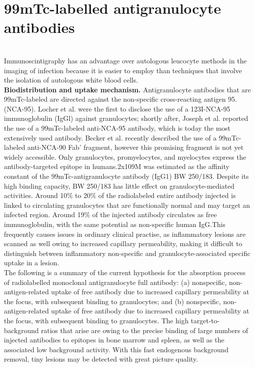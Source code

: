 \documentclass[12pt]{article}
\begin{document}
\section{99mTc-labelled antigranulocyte antibodies}
\\Immunoscintigraphy has an advantage over autologous leucocyte methods in the imaging of infection because it is easier to employ than techniques that involve the isolation of autologous white blood cells.
\\\textbf{Biodistribution and uptake mechanism.} Antigranulocyte antibodies that are 99mTc-labeled are directed against the non-specific cross-reacting antigen 95. (NCA-95). Locher et al. were the first to disclose the use of a 123I-NCA-95 immunoglobulin (IgGl) against granulocytes; shortly after, Joseph et al. reported the use of a 99mTc-labeled anti-NCA-95 antibody, which is today the most extensively used antibody. Becker et al.  recently described the use of a 99mTc-labeled anti-NCA-90 Fab' fragment, however this promising fragment is not yet widely accessible. Only granulocytes, promyelocytes, and myelocytes express the antibody-targeted epitope in humans.2x109M was estimated as the affinity constant of the 99mTc-antigranulocyte antibody (IgG1) BW 250/183. Despite its high binding capacity, BW 250/183 has little effect on granulocyte-mediated activities. Around 10$\%$ to 20$\%$ of the radiolabeled entire antibody injected is linked to circulating granulocytes that are functionally normal and may target an infected region. Around 19$\%$ of the injected antibody circulates as free immunoglobulin, with the same potential as non-specific human IgG.This frequently causes issues in ordinary clinical practise, as inflammatory lesions are scanned as well owing to increased capillary permeability, making it difficult to distinguish between inflammatory non-specific and granulocyte-associated specific uptake in a lesion.
\\The following is a summary of the current hypothesis for the absorption process of radiolabelled monoclonal antigranulocyte full antibody: (a) nonspecific, non-antigen-related uptake of free antibody due to increased capillary permeability at the focus, with subsequent binding to granulocytes; and (b) nonspecific, non-antigen-related uptake of free antibody due to increased capillary permeability at the focus, with subsequent binding to granulocytes. The high target-to-background ratios that arise are owing to the precise binding of large numbers of injected antibodies to epitopes in bone marrow and spleen, as well as the associated low background activity. With this fast endogenous background removal, tiny lesions may be detected with great picture quality.
\end{document}
